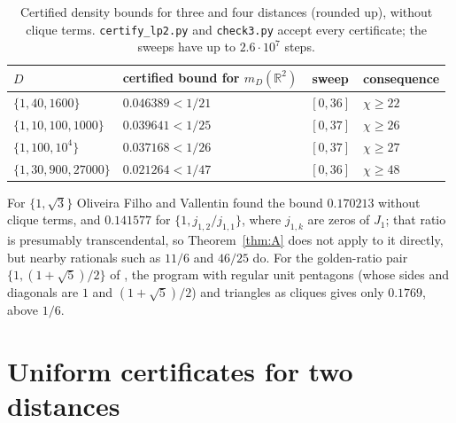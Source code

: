 \documentclass[11pt,a4paper]{amsart}
\theoremstyle{definition}
\theoremstyle{remark}
\newcommand{\R}{\mathbb{R}}
\begin{document}
\begin{table}[ht]
\centering
\begin{tabular}{llcl}
\toprule
$D$ & certified bound for $m_D(\R^2)$ & sweep & consequence\\
\midrule
$\{1,40,1600\}$ & $0.046389<1/21$ & $[0,36]$ & $\chi\ge22$\\
$\{1,10,100,1000\}$ & $0.039641<1/25$ & $[0,37]$ & $\chi\ge26$\\
$\{1,100,10^4\}$ & $0.037168<1/26$ & $[0,37]$ & $\chi\ge27$\\
$\{1,30,900,27000\}$ & $0.021264<1/47$ & $[0,36]$ & $\chi\ge48$\\
\bottomrule
\end{tabular}
\caption{Certified density bounds for three and four distances (rounded up), without clique terms.
\texttt{certify\_lp2.py} and \texttt{check3.py} accept every certificate; the sweeps have up to $2.6\cdot10^7$
steps.}
\label{tab:many}
\end{table}

For $\{1,\sqrt3\}$ Oliveira Filho and Vallentin \cite[§4]{OFV} found the bound $0.170213$ without clique terms, and
$0.141577$ for $\{1,j_{1,2}/j_{1,1}\}$, where $j_{1,k}$ are zeros of $J_1$; that ratio is presumably transcendental,
so Theorem~\ref{thm:A} does not apply to it directly, but nearby rationals such as $11/6$ and $46/25$ do. For the
golden-ratio pair $\{1,(1+\sqrt5)/2\}$ of \cite{OTH}, the program with regular unit pentagons (whose sides and
diagonals are $1$ and $(1+\sqrt5)/2$) and triangles as cliques gives only $0.1769$, above $1/6$.

\section{Uniform certificates for two distances}\label{sec:uniform}
\end{document}

